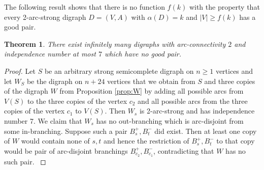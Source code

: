 \documentclass{article}
\newtheorem{theorem}{Theorem}
\theoremstyle{definition}
\newcommand{\jbj}[1]{{#1}}
\newcommand{\2}{\vspace{0.2cm}}
\begin{document}
 

 
  \jbj{The following result  shows that there is no function $f(k)$ with the
  property that every 2-arc-strong digraph $D=(V,A)$ with $\alpha(D)=k$ and
  $|V|\geq f(k)$ has a good pair.}
  
\begin{theorem}
    \label{thm:nopairB}
    There exist infinitely many digraphs with arc-connectivity $2$ and
    independence number at most $7$ which have no good pair.  \end{theorem}
\begin{proof}
\jbj{Let $S$ be an arbitrary strong semicomplete digraph on $n\geq 1$ vertices and let $W_S$ be the digraph on $n+24$ vertices that we obtain from $S$ and three copies of the digraph $W$ from Proposition \ref{prop:W} by adding all possible arcs from $V(S)$ to the three copies of the vertex $c_2$ and all possible arcs from the three copies of the vertex $c_1$ to $V(S)$. Then $W_s$ is 2-arc-strong and has independence number 7. We claim that $W_s$ has no out-branching which is arc-disjoint from some in-branching. Suppose such a pair $B^+_s,B^-_t$ did exist. Then at least one copy of $W$ would contain none of $s,t$ and hence the restriction of $B^+_s,B^-_t$ to that copy would be  pair of arc-disjoint branchings $B_{c_2}^+,B_{c_1}^-$, contradicting that $W$ has no such pair. }
\end{proof}
\end{document}
